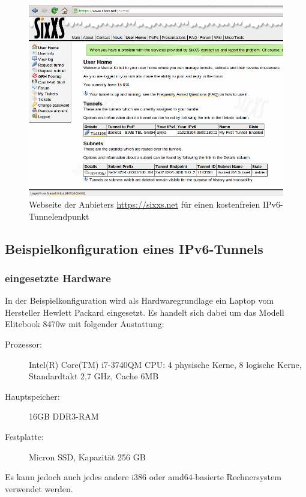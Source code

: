 \documentclass[a4paper,12pt]{scrartcl}
\begin{document}
\begin{figure}[htb]
\begin{center}
 \includegraphics[width=1\hsize]{./images/sixxs.png}
 \end{center}
\caption[Webseite der Anbieters \url{https://sixxs.net} f\"ur einen kostenfreien IPv6-Tunnelendpunkt]{\label{sixxs}Webseite der Anbieters \url{https://sixxs.net} f\"ur einen kostenfreien IPv6-Tunnelendpunkt}
\end{figure}

\subsection{Beispielkonfiguration eines IPv6-Tunnels}

\subsubsection{eingesetzte Hardware}
In der Beispielkonfiguration wird als Hardwaregrundlage ein Laptop vom Hersteller Hewlett Packard eingesetzt. Es handelt sich dabei um das Modell Elitebook 8470w mit folgender Austattung:
\begin{description}
\item[Prozessor:] Intel(R) Core(TM) i7-3740QM CPU: 4 physische Kerne, 8 logische Kerne, Standardtakt 2,7 GHz, Cache 6MB
\item[Hauptspeicher:] 16GB DDR3-RAM
\item[Festplatte:] Micron SSD, Kapazität 256 GB 
\end{description}

Es kann jedoch auch jedes andere i386 oder amd64-basierte Rechnersystem verwendet werden. 
\end{document}
